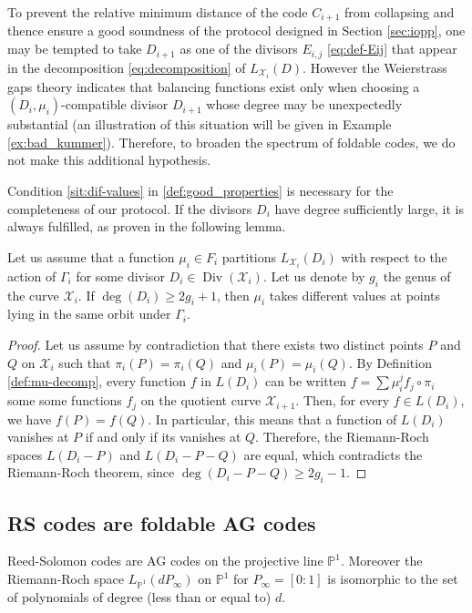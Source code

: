 \documentclass[a4paper,USenglish,autoref]{lipics-v2021}
\newcommand\PP{\mathbb{P}}
\DeclareMathOperator{\Div}{Div}
\newcommand\calX{\mathcal{X}}
\begin{document}
To prevent the relative minimum distance of the code $C_{i+1}$ from collapsing and thence ensure a good soundness of the protocol designed in Section \ref{sec:iopp}, one may be tempted to take $D_{i+1}$ as one of the divisors $E_{i,j}$ \eqref{eq:def-Eij} that appear in the decomposition \eqref{eq:decomposition} of $L_{\calX_i}(D)$. However the Weierstrass gaps theory indicates that balancing functions exist only when choosing a $(D_i,\mu_i)$-compatible divisor $D_{i+1}$ whose degree may be unexpectedly substantial (an illustration of this situation will be given in Example \ref{ex:bad_kummer}). Therefore, to broaden the spectrum of foldable codes, we do not make this additional hypothesis.

Condition \ref{sit:dif-values} in \autoref{def:good_properties} is necessary for the completeness of our protocol. If the divisors $D_i$ have degree sufficiently large, it is always fulfilled, as proven in the following lemma.

\begin{lemma}\label{lem:mu-ok-interpolation}
	Let us assume that a function $\mu_i \in F_i$ partitions $L_{\calX_i}(D_i)$ with respect to the action of $\Gamma_i$ for some divisor $D_i \in \Div(\calX_i)$. Let us denote by $g_i$ the genus of the curve $\calX_i$. If $\deg(D_i)  \geq 2g_i+1$, then $\mu_i$ takes different values at points lying in the same orbit under $\Gamma_i$.
\end{lemma}

\begin{proof}
	Let us assume by contradiction that there exists two distinct points $P$ and $Q$ on $\calX_i$ such that $\pi_i(P)=\pi_i(Q)$ and $\mu_i(P)=\mu_i(Q)$. By Definition \ref{def:mu-decomp}, every function $f$ in $L(D_i)$ can be written $f=\sum\mu_i^j f_j \circ \pi_i$ some some functions $f_j$ on the quotient curve $\calX_{i+1}$. Then, for every $f \in L(D_i)$, we have $f(P)=f(Q)$. In particular, this means that a function of $L(D_i)$ vanishes at $P$ if and only if its vanishes at $Q$. Therefore, the Riemann-Roch spaces $L(D_i-P)$ and $L(D_i-P-Q)$ are equal, which contradicts the Riemann-Roch theorem, since $\deg(D_i-P-Q) \geq 2g_i-1$.
\end{proof} 


\subsection{RS codes are foldable AG codes}\label{ex:RS-foldable}

Reed-Solomon codes are AG codes on the projective line $\PP^1$. Moreover the Riemann-Roch space $L_{\PP^1}(d P_\infty)$ on $\PP^1$ for $P_\infty=[0:1]$ is isomorphic to 
the set of polynomials of degree (less than or equal to) $d$.
\end{document}
